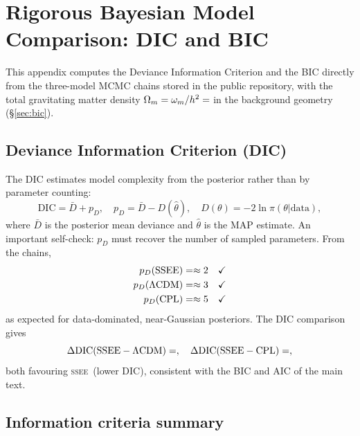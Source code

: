 \documentclass[12pt,a4paper]{article}
\newcommand{\SSEE}{\ifmmode\mathrm{SSEE}\else\textsc{ssee}\fi}
\newcommand{\LCDM}{\ifmmode\Lambda\mathrm{CDM}\else$\Lambda$CDM\fi}
\begin{document}
\appendix
\section{Rigorous Bayesian Model Comparison: DIC and BIC}
\label{app:dic}

\noindent
This appendix computes the Deviance Information Criterion and the BIC directly
from the three-model MCMC chains stored in the public repository, with the total
gravitating matter density $\Omega_m=\omega_m/h^2=\val{OMEGA_M_TOTAL_d6}$ in the background
geometry (§\ref{sec:bic}).

\subsection*{Deviance Information Criterion (DIC)}

The DIC \citep{Spiegelhalter2002} estimates model complexity from the posterior
rather than by parameter counting:
\begin{equation}
  \mathrm{DIC} = \bar{D} + p_D,\quad
  p_D = \bar{D} - D(\hat\theta),\quad
  D(\theta) = -2\ln\pi(\theta|\mathrm{data}),
\end{equation}
where $\bar{D}$ is the posterior mean deviance and $\hat\theta$ is the MAP
estimate. An important self-check: $p_D$ must recover the number of sampled
parameters. From the chains,
\begin{align}
  p_D(\mathrm{SSEE}) &= \val{p2_pD_ssee} \approx 2\quad\checkmark \\
  p_D(\mathrm{\LCDM}) &= \val{p2_pD_lcdm} \approx 3\quad\checkmark \\
  p_D(\mathrm{CPL})  &= \val{p2_pD_cpl} \approx 5\quad\checkmark
\end{align}
as expected for data-dominated, near-Gaussian posteriors. The DIC comparison gives
\begin{equation}
  \Delta\mathrm{DIC}(\mathrm{SSEE}-\mathrm{\LCDM}) = \val{p2_dDIC_lcdm},\quad
  \Delta\mathrm{DIC}(\mathrm{SSEE}-\mathrm{CPL}) = \val{p2_dDIC_cpl},
\end{equation}
both favouring \SSEE\ (lower DIC), consistent with the BIC and AIC of the
main text.

\subsection*{Information criteria summary}
\end{document}
